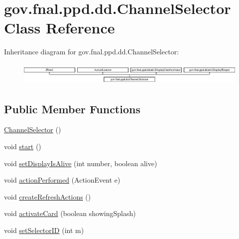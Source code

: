 \hypertarget{classgov_1_1fnal_1_1ppd_1_1dd_1_1ChannelSelector}{\section{gov.\-fnal.\-ppd.\-dd.\-Channel\-Selector Class Reference}
\label{classgov_1_1fnal_1_1ppd_1_1dd_1_1ChannelSelector}
}
Inheritance diagram for gov.\-fnal.\-ppd.\-dd.\-Channel\-Selector\-:\begin{figure}[H]
\begin{center}
\leavevmode
\includegraphics[height=1.102362cm]{classgov_1_1fnal_1_1ppd_1_1dd_1_1ChannelSelector}
\end{center}
\end{figure}
\subsection*{Public Member Functions}
\begin{DoxyCompactItemize}
\item 
\hyperlink{classgov_1_1fnal_1_1ppd_1_1dd_1_1ChannelSelector_a95df49bb45dc325360d7af8ef4a4da22}{Channel\-Selector} ()
\item 
void \hyperlink{classgov_1_1fnal_1_1ppd_1_1dd_1_1ChannelSelector_a9df07ecad4e75132a866bc81169e0df6}{start} ()
\item 
void \hyperlink{classgov_1_1fnal_1_1ppd_1_1dd_1_1ChannelSelector_ab92bc1ecd4b25b8a2a1fed26b57d4d57}{set\-Display\-Is\-Alive} (int number, boolean alive)
\item 
void \hyperlink{classgov_1_1fnal_1_1ppd_1_1dd_1_1ChannelSelector_a58d155d92e2b6f64d228cadc3b1039e9}{action\-Performed} (Action\-Event e)
\item 
void \hyperlink{classgov_1_1fnal_1_1ppd_1_1dd_1_1ChannelSelector_a23fbec08667c8708a2a9833005e1edec}{create\-Refresh\-Actions} ()
\item 
void \hyperlink{classgov_1_1fnal_1_1ppd_1_1dd_1_1ChannelSelector_a637dbc852a236c96841cd5d5492a1079}{activate\-Card} (boolean showing\-Splash)
\item 
void \hyperlink{classgov_1_1fnal_1_1ppd_1_1dd_1_1ChannelSelector_a930233587284af74e0533faffc368804}{set\-Selector\-I\-D} (int m)
\end{DoxyCompactItemize}
